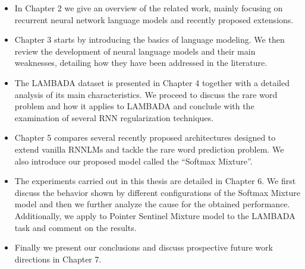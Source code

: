 \begin{itemize}

\item In Chapter 2 we give an overview of the related work, mainly focusing on recurrent neural network language models and recently proposed extensions.

\item Chapter 3 starts by introducing the basics of language modeling. We then review the development of neural language models and their main weaknesses, detailing how they have been addressed in the literature.

\item The LAMBADA dataset is presented in Chapter 4 together with a detailed analysis of its main characteristics. We proceed to discuss the rare word problem and how it applies to LAMBADA and conclude with the examination of several RNN regularization techniques.

\item Chapter 5 compares several recently proposed architectures designed to extend vanilla RNNLMs and tackle the rare word prediction problem. We also introduce our proposed model called the ``Softmax Mixture''.

\item The experiments carried out in this thesis are detailed in Chapter 6. We first discuss the behavior shown by different configurations of the Softmax Mixture model and then we further analyze the cause for the obtained performance. Additionally, we apply to Pointer Sentinel Mixture model to the LAMBADA task and comment on the results.

\item Finally we present our conclusions and discuss prospective future work directions in Chapter 7.

\end{itemize}
